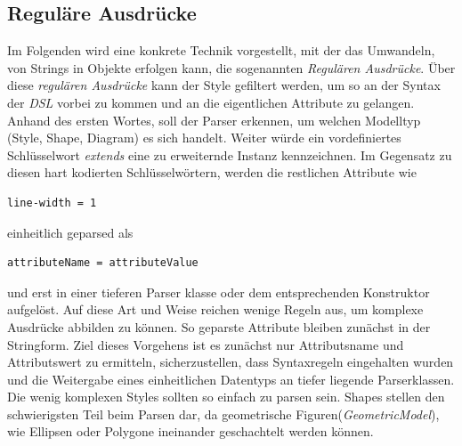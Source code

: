 \subsection{Reguläre Ausdrücke}Im Folgenden wird eine konkrete Technik vorgestellt, mit der das Umwandeln, von Strings in Objekte erfolgen kann,
die sogenannten \textit{Regulären Ausdrücke}. Über diese \textit{regulären Ausdrücke} kann der Style gefiltert werden, um so an der Syntax der \textit{DSL} vorbei zu kommen und an die eigentlichen Attribute zu gelangen.
Anhand des ersten Wortes, soll der Parser erkennen, um welchen Modelltyp (Style, Shape, Diagram) es sich handelt. 
Weiter würde ein vordefiniertes Schlüsselwort \textit{extends} eine zu erweiternde Instanz kennzeichnen.
Im Gegensatz zu diesen hart kodierten Schlüsselwörtern, werden die restlichen Attribute wie
\begin{lstlisting}[style=spray, aboveskip=0pt]
line-width = 1
\end{lstlisting} einheitlich geparsed als
\begin{lstlisting}[style=spray, aboveskip=0pt]
attributeName = attributeValue
\end{lstlisting} und erst in einer tieferen Parser klasse oder dem entsprechenden Konstruktor aufgelöst. Auf diese Art und Weise reichen wenige Regeln aus, um komplexe Ausdrücke abbilden zu können. So geparste Attribute bleiben zunächst in der Stringform. Ziel dieses Vorgehens ist es zunächst nur Attributsname und Attributswert zu ermitteln, sicherzustellen, dass Syntaxregeln eingehalten wurden und die Weitergabe eines einheitlichen Datentyps an tiefer liegende Parserklassen.
Die wenig komplexen Styles sollten so einfach zu parsen sein. Shapes stellen den schwierigsten Teil beim Parsen dar, da geometrische Figuren(\textit{GeometricModel}), wie Ellipsen oder Polygone ineinander geschachtelt werden können.
